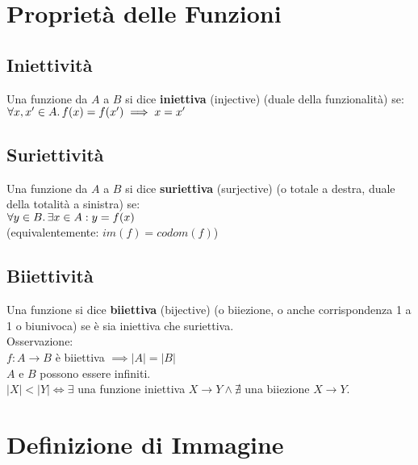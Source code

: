\documentclass[a4paper, twoside, italian, 11pt]{book}
\begin{document}
\section{Proprietà delle Funzioni}


\subsection{Iniettività}

Una funzione da $A$ a $B$ si dice \textbf{iniettiva} (injective) (duale della funzionalità) se: \\

$\forall x, x' \in A \ldotp f(x) = f(x') \implies x = x'$


\subsection{Suriettività}

Una funzione da $A$ a $B$ si dice \textbf{suriettiva} (surjective) (o totale a destra, duale della totalità a sinistra) se: \\

$\forall y \in B \ldotp \exists x \in A : y = f(x)$ \\

\noindent
(equivalentemente: $im(f) = codom(f)$)


\subsection{Biiettività}

Una funzione si dice \textbf{biiettiva} (bijective) (o biiezione, o anche corrispondenza 1 a 1 o biunivoca) se è sia iniettiva che suriettiva. \\

\noindent
Osservazione: \\

$f : A \rightarrow B$ è biiettiva $\implies \left | A \right | = \left | B \right |$ \\

\noindent
$A$ e $B$ possono essere infiniti. \\

\noindent
$\left | X \right | < \left | Y \right | \iff \exists$ una funzione iniettiva $X \rightarrow Y \land \nexists$ una biiezione $X \rightarrow Y$.



\section{Definizione di Immagine}
\end{document}
